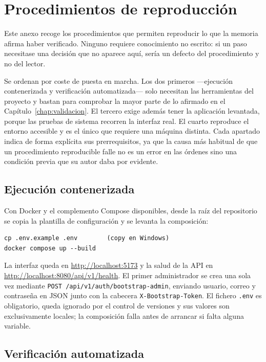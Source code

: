 \chapter{Procedimientos de reproducción}
\label{ap:procedimientos}

Este anexo recoge los procedimientos que permiten reproducir lo que la memoria afirma haber verificado. Ninguno requiere conocimiento no escrito: si un paso necesitase una decisión que no aparece aquí, sería un defecto del procedimiento y no del lector.

Se ordenan por coste de puesta en marcha. Los dos primeros ---ejecución contenerizada y verificación automatizada--- solo necesitan las herramientas del proyecto y bastan para comprobar la mayor parte de lo afirmado en el Capítulo~\ref{chap:validacion}. El tercero exige además tener la aplicación levantada, porque las pruebas de sistema recorren la interfaz real. El cuarto reproduce el entorno accesible y es el único que requiere una máquina distinta. Cada apartado indica de forma explícita sus prerrequisitos, ya que la causa más habitual de que un procedimiento reproducible falle no es un error en las órdenes sino una condición previa que su autor daba por evidente.

\section{Ejecución contenerizada}

Con Docker y el complemento Compose disponibles, desde la raíz del repositorio se copia la plantilla de configuración y se levanta la composición:

\begin{verbatim}
cp .env.example .env        (copy en Windows)
docker compose up --build
\end{verbatim}

La interfaz queda en \url{http://localhost:5173} y la salud de la API en \url{http://localhost:8080/api/v1/health}. El primer administrador se crea una sola vez mediante \texttt{POST /api/v1/auth/bootstrap-admin}, enviando usuario, correo y contraseña en JSON junto con la cabecera \texttt{X-Bootstrap-Token}. El fichero \texttt{.env} es obligatorio, queda ignorado por el control de versiones y sus valores son exclusivamente locales; la composición falla antes de arrancar si falta alguna variable.

\section{Verificación automatizada}

